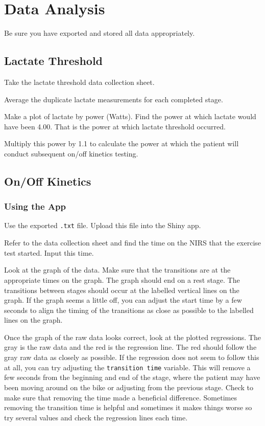 \documentclass[
]{book}
\begin{document}
\hypertarget{DataAnalysis}{%
\chapter{Data Analysis}\label{DataAnalysis}}

Be sure you have exported and stored all data appropriately.

\hypertarget{DataAnalysis-LT}{%
\section{Lactate Threshold}\label{DataAnalysis-LT}}

Take the lactate threshold data collection sheet.

Average the duplicate lactate measurements for each completed stage.

Make a plot of lactate by power (Watts). Find the power at which lactate would have been 4.00. That is the power at which lactate threshold occurred.

Multiply this power by 1.1 to calculate the power at which the patient will conduct subsequent on/off kinetics testing.

\hypertarget{DataAnalysis-Onoff}{%
\section{On/Off Kinetics}\label{DataAnalysis-Onoff}}

\hypertarget{using-the-app}{%
\subsection{Using the App}\label{using-the-app}}

Use the exported \texttt{.txt} file. Upload this file into the Shiny app.

Refer to the data collection sheet and find the time on the NIRS that the exercise test started. Input this time.

Look at the graph of the data. Make sure that the transitions are at the appropriate times on the graph. The graph should end on a rest stage. The transitions between stages should occur at the labelled vertical lines on the graph. If the graph seems a little off, you can adjust the start time by a few seconds to align the timing of the transitions as close as possible to the labelled lines on the graph.

Once the graph of the raw data looks correct, look at the plotted regressions. The gray is the raw data and the red is the regression line. The red should follow the gray raw data as closely as possible. If the regression does not seem to follow this at all, you can try adjusting the \texttt{transition\ time} variable. This will remove a few seconds from the beginning and end of the stage, where the patient may have been moving around on the bike or adjusting from the previous stage. Check to make sure that removing the time made a beneficial difference. Sometimes removing the transition time is helpful and sometimes it makes things worse so try several values and check the regression lines each time.
\end{document}
